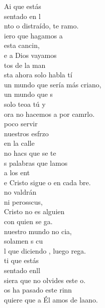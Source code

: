 \begin{cancion}%
	Ai que estás \\
	sentado en l      \\
	nto o distraído, te ramo.\\
	iero que hagamos a \\
	esta cancin, \\
	e a Dios vayamos \\
	tos de la man \\
	\jump
	sta ahora solo habla tí\\
	un mundo que sería más criano,\\
	 un mundo que s \\
	solo teoa tú y\\
	ora no hacemos a por camrlo.\\
	\jump
	 poco servir \\
	nuestros esfrzo \\
	en la calle \\
	no hacs que se te \\
	s palabras que lamos \\
	a los ent \\
	e Cristo sigue o en cada bre.\\
	\jump
	 no valdrán \\
	ni perosscus,  \\
	 Cristo no es alguien \\
	con quien se ga.\\
	 nuestro mundo no cia, \\
	solamen s cu  \\
	l que diciendo , luego rega.\\
	\jump
	ti que estás \\
	sentado enll   \\
	siera que no olvides este o.\\
	os ha pasado  este rinn \\
	quiere que a Él amos de laano.\\
\end{cancion}%
